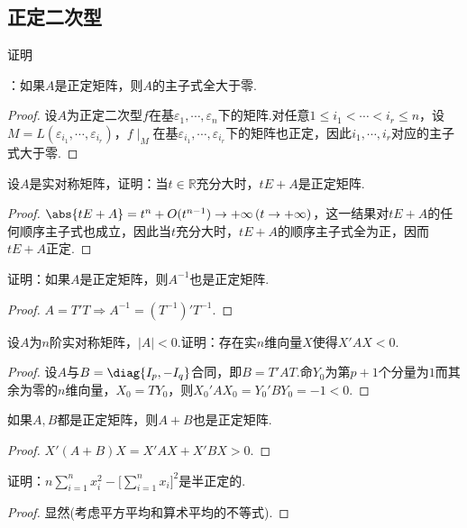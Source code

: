 \subsection{正定二次型}
\begin{prob}[3]
	\hypertarget{PositiveDefiniteMinor}{证明}：如果$A$是正定矩阵，则$A$的主子式全大于零.
\end{prob}
\begin{proof}
	设$A$为正定二次型$f$在基$\varepsilon_1,\cdots,\varepsilon_n$下的矩阵.对任意$1\le i_1<\cdots<i_r\le n$，设$M=L(\varepsilon_{i_1},\cdots,\varepsilon_{i_r})$，$f\mid_M$在基$\varepsilon_{i_1},\cdots,\varepsilon_{i_r}$下的矩阵也正定，因此$i_1,\cdots,i_r$对应的主子式大于零.
\end{proof}
\begin{prob}[4]
	设$A$是实对称矩阵，证明：当$t\in\mathbb{R}$充分大时，$tE+A$是正定矩阵.
\end{prob}
\begin{proof}
	$\abs{tE+A}=t^n+O(t^{n-1})\to+\infty\,(t\to+\infty)$，这一结果对$tE+A$的任何顺序主子式也成立，因此当$t$充分大时，$tE+A$的顺序主子式全为正，因而$tE+A$正定.
\end{proof}
\begin{prob}[5]
	证明：如果$A$是正定矩阵，则$A^{-1}$也是正定矩阵.
\end{prob}
\begin{proof}
	$A=T'T\Rightarrow A^{-1}=(T^{-1})'T^{-1}$.
\end{proof}
\begin{prob}[7]
	设$A$为$n$阶实对称矩阵，$|A|<0$.证明：存在实$n$维向量$X$使得$X'AX<0$.
\end{prob}
\begin{proof}
	设$A$与$B=\diag{I_p,-I_q}$合同，即$B=T'AT$.命$Y_0$为第$p+1$个分量为$1$而其余为零的$n$维向量，$X_0=TY_0$，则$X_0'AX_0=Y_0'BY_0=-1<0$.
\end{proof}
\begin{prob}[8]
	如果$A,B$都是正定矩阵，则$A+B$也是正定矩阵.
\end{prob}
\begin{proof}
	$X'(A+B)X=X'AX+X'BX>0$.
\end{proof}
\begin{prob}[9]
	证明：$n\displaystyle\sum_{i=1}^{n}x_i^2-\biggl[\sum_{i=1}^{n}x_i\biggr]^2$是半正定的.
\end{prob}
\begin{proof}
	显然(考虑平方平均和算术平均的不等式).
\end{proof}
